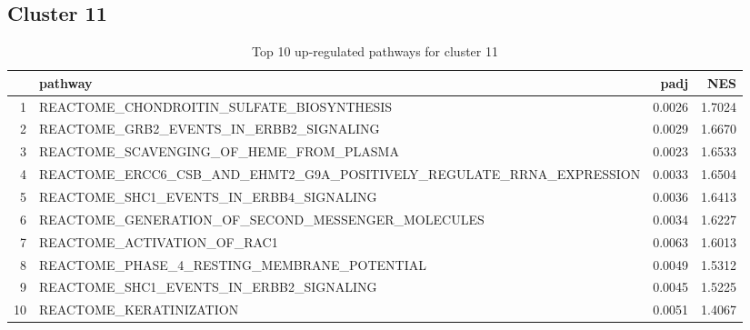 \documentclass{article}
\begin{document}
\subsection{Cluster 11 }
\begin{table}[H]
\centering
\begin{tabularx}{\textwidth}{rlrr}
  \hline
 & pathway & padj & NES \\ 
  \hline
1 & REACTOME\_CHONDROITIN\_SULFATE\_BIOSYNTHESIS & 0.0026 & 1.7024 \\ 
  2 & REACTOME\_GRB2\_EVENTS\_IN\_ERBB2\_SIGNALING & 0.0029 & 1.6670 \\ 
  3 & REACTOME\_SCAVENGING\_OF\_HEME\_FROM\_PLASMA & 0.0023 & 1.6533 \\ 
  4 & REACTOME\_ERCC6\_CSB\_AND\_EHMT2\_G9A\_POSITIVELY\_REGULATE\_RRNA\_EXPRESSION & 0.0033 & 1.6504 \\ 
  5 & REACTOME\_SHC1\_EVENTS\_IN\_ERBB4\_SIGNALING & 0.0036 & 1.6413 \\ 
  6 & REACTOME\_GENERATION\_OF\_SECOND\_MESSENGER\_MOLECULES & 0.0034 & 1.6227 \\ 
  7 & REACTOME\_ACTIVATION\_OF\_RAC1 & 0.0063 & 1.6013 \\ 
  8 & REACTOME\_PHASE\_4\_RESTING\_MEMBRANE\_POTENTIAL & 0.0049 & 1.5312 \\ 
  9 & REACTOME\_SHC1\_EVENTS\_IN\_ERBB2\_SIGNALING & 0.0045 & 1.5225 \\ 
  10 & REACTOME\_KERATINIZATION & 0.0051 & 1.4067 \\ 
   \hline
\end{tabularx}
\caption{Top 10 up-regulated pathways for cluster 11} 
\label{tab:q3_2_11}
\end{table}
\end{document}
